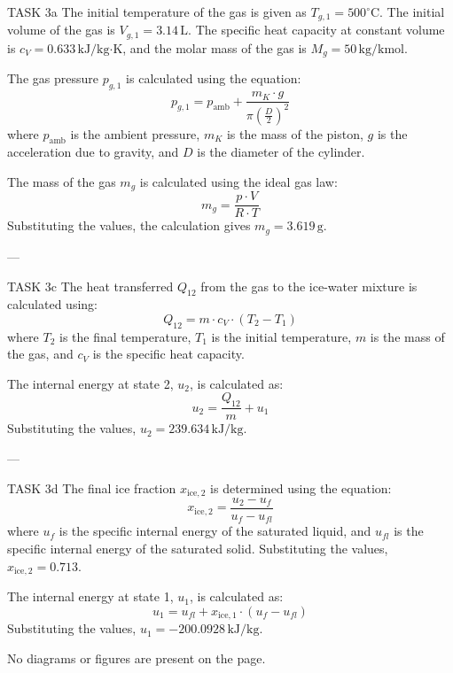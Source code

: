 TASK 3a  
The initial temperature of the gas is given as \( T_{g,1} = 500^\circ\text{C} \). The initial volume of the gas is \( V_{g,1} = 3.14 \, \text{L} \). The specific heat capacity at constant volume is \( c_V = 0.633 \, \text{kJ/kg·K} \), and the molar mass of the gas is \( M_g = 50 \, \text{kg/kmol} \).  

The gas pressure \( p_{g,1} \) is calculated using the equation:  
\[
p_{g,1} = p_{\text{amb}} + \frac{m_K \cdot g}{\pi \left( \frac{D}{2} \right)^2}
\]  
where \( p_{\text{amb}} \) is the ambient pressure, \( m_K \) is the mass of the piston, \( g \) is the acceleration due to gravity, and \( D \) is the diameter of the cylinder.  

The mass of the gas \( m_g \) is calculated using the ideal gas law:  
\[
m_g = \frac{p \cdot V}{R \cdot T}
\]  
Substituting the values, the calculation gives \( m_g = 3.619 \, \text{g} \).  

---

TASK 3c  
The heat transferred \( Q_{12} \) from the gas to the ice-water mixture is calculated using:  
\[
Q_{12} = m \cdot c_V \cdot (T_2 - T_1)
\]  
where \( T_2 \) is the final temperature, \( T_1 \) is the initial temperature, \( m \) is the mass of the gas, and \( c_V \) is the specific heat capacity.  

The internal energy at state 2, \( u_2 \), is calculated as:  
\[
u_2 = \frac{Q_{12}}{m} + u_1
\]  
Substituting the values, \( u_2 = 239.634 \, \text{kJ/kg} \).  

---

TASK 3d  
The final ice fraction \( x_{\text{ice},2} \) is determined using the equation:  
\[
x_{\text{ice},2} = \frac{u_2 - u_f}{u_f - u_{fl}}
\]  
where \( u_f \) is the specific internal energy of the saturated liquid, and \( u_{fl} \) is the specific internal energy of the saturated solid. Substituting the values, \( x_{\text{ice},2} = 0.713 \).  

The internal energy at state 1, \( u_1 \), is calculated as:  
\[
u_1 = u_{fl} + x_{\text{ice},1} \cdot (u_f - u_{fl})
\]  
Substituting the values, \( u_1 = -200.0928 \, \text{kJ/kg} \).  

No diagrams or figures are present on the page.